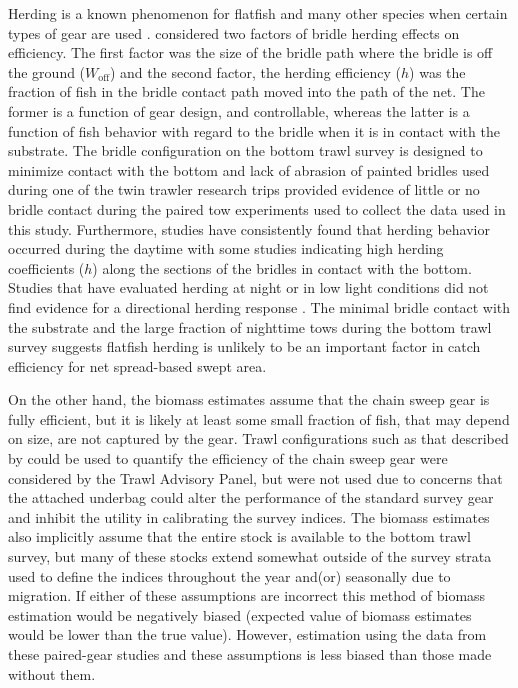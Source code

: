 \documentclass[
  12pt,
]{article}
\begin{document}
Herding is a known phenomenon for flatfish and many other species when
certain types of gear are used
\citep{rammxiao95,somertonmunro01,somertonetal07,roseetal10}.
\citet{somertonmunro01} considered two factors of bridle herding effects
on efficiency. The first factor was the size of the bridle path where
the bridle is off the ground (\(W_\text{off}\)) and the second factor,
the herding efficiency (\(h\)) was the fraction of fish in the bridle
contact path moved into the path of the net. The former is a function of
gear design, and controllable, whereas the latter is a function of fish
behavior with regard to the bridle when it is in contact with the
substrate. The bridle configuration on the bottom trawl survey is
designed to minimize contact with the bottom and lack of abrasion of
painted bridles used during one of the twin trawler research trips
provided evidence of little or no bridle contact during the paired tow
experiments used to collect the data used in this study. Furthermore,
studies have consistently found that herding behavior occurred during
the daytime
\citep{glasswardle89,somertonmunro01,ryerbarnett06,bryanetal14,ryeretal10,deanetal21}
with some studies indicating high herding coefficients (\(h\)) along the
sections of the bridles in contact with the bottom. Studies that have
evaluated herding at night or in low light conditions did not find
evidence for a directional herding response
\citep{glasswardle89,ryerbarnett06,ryer08,ryeretal10}. The minimal
bridle contact with the substrate and the large fraction of nighttime
tows during the bottom trawl survey suggests flatfish herding is
unlikely to be an important factor in catch efficiency for net
spread-based swept area.

On the other hand, the biomass estimates assume that the chain sweep
gear is fully efficient, but it is likely at least some small fraction
of fish, that may depend on size, are not captured by the gear. Trawl
configurations such as that described by \citet{munrosomerton02} could
be used to quantify the efficiency of the chain sweep gear were
considered by the Trawl Advisory Panel, but were not used due to
concerns that the attached underbag could alter the performance of the
standard survey gear and inhibit the utility in calibrating the survey
indices. The biomass estimates also implicitly assume that the entire
stock is available to the bottom trawl survey, but many of these stocks
extend somewhat outside of the survey strata used to define the indices
throughout the year and(or) seasonally due to migration. If either of
these assumptions are incorrect this method of biomass estimation would
be negatively biased (expected value of biomass estimates would be lower
than the true value). However, estimation using the data from these
paired-gear studies and these assumptions is less biased than those made
without them.
\end{document}
